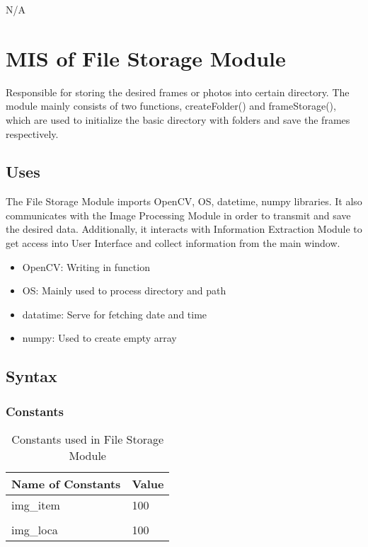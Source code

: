 \documentclass[12pt, titlepage]{article}
\begin{document}
N/A

\newpage

\section{MIS of File Storage Module} 
Responsible for storing the desired frames or photos into certain directory. The module mainly consists of two functions, createFolder() and frameStorage(), which are used to initialize the basic directory with folders and save the frames respectively.
\subsection{Uses}
The File Storage Module imports OpenCV, OS, datetime, numpy libraries. It also communicates with the Image Processing Module in order to transmit and save the desired data. Additionally, it interacts with Information Extraction Module to get access into User Interface and collect information from the main window.\\
\begin{itemize}
\item OpenCV: Writing in function\\
\item OS: Mainly used to process directory and path\\
\item datatime: Serve for fetching date and time\\
\item numpy: Used to create empty array\\
\end{itemize}
\subsection{Syntax}

\subsubsection{Constants}
\begin{table}[H]
\caption{Constants used in File Storage Module} 
\begin{tabularx}{\textwidth}{XX}
\toprule
\textbf{Name of Constants} & \textbf{Value}\\
\midrule
img\_item & 100\\\\
img\_loca & 100\\
\bottomrule
\end{tabularx}
\end{table}
\end{document}
